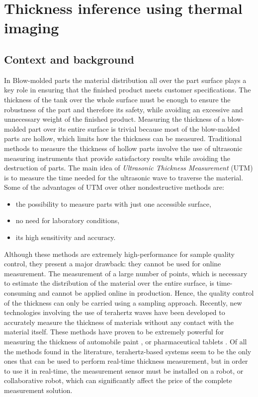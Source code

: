 \section{Thickness inference using thermal imaging}

\subsection{Context and background} \label{Context and background}

In Blow-molded parts the material distribution all over the part surface plays a key role in ensuring that the finished product meets customer specifications. The thickness of the tank over the whole surface must be enough to ensure the robustness of the part and therefore its safety, while avoiding an excessive and unnecessary weight of the finished product. Measuring the thickness of a blow-molded part over its entire surface is trivial because most of the blow-molded parts are hollow, which limits how the thickness can be measured. Traditional methods to measure the thickness of hollow parts involve the use of ultrasonic measuring instruments that provide satisfactory results while avoiding the destruction of parts. The main idea of \textit{Ultrasonic Thickness Measurement} (UTM) is to measure the time needed for the ultrasonic wave to traverse the material. Some of the advantages of UTM over other nondestructive methods are:
\begin{itemize}
    \item the possibility to measure parts with just one accessible surface,
    \item no need for laboratory conditions,
    \item  its high sensitivity and accuracy.
\end{itemize}
 
Although these methods are extremely high-performance for sample quality control, they present a major drawback: they cannot be used for online measurement. The measurement of a large number of points, which is necessary to estimate the distribution of the material over the entire surface, is time-consuming and cannot be applied online in production. Hence, the quality control of the thickness can only be carried using a sampling approach. Recently, new technologies involving the use of terahertz waves have been developed to accurately measure the thickness of materials without any contact with the material itself. These methods have proven to be extremely powerful for measuring the thickness of automobile paint \citep{su2014terahertz,krimi2016highly}, or pharmaceutical tablets \citep{may2011terahertz}. Of all the methods found in the literature, terahertz-based systems seem to be the only ones that can be used to perform real-time thickness measurement, but in order to use it in real-time, the measurement sensor must be installed on a robot, or collaborative robot, which can significantly affect the price of the complete measurement solution.

